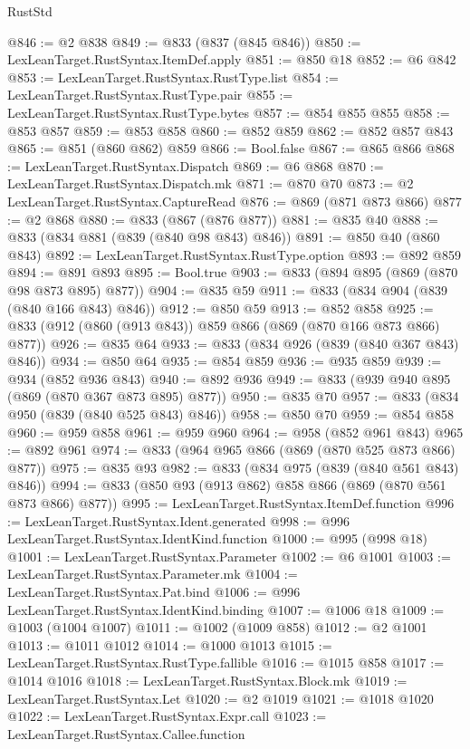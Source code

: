 \begin{lexlean}{RustStd}
\begin{coremodule}
@846 := @2 @838
@849 := @833 (@837 (@845 @846))
@850 := LexLeanTarget.RustSyntax.ItemDef.apply
@851 := @850 @18
@852 := @6 @842
@853 := LexLeanTarget.RustSyntax.RustType.list
@854 := LexLeanTarget.RustSyntax.RustType.pair
@855 := LexLeanTarget.RustSyntax.RustType.bytes
@857 := @854 @855 @855
@858 := @853 @857
@859 := @853 @858
@860 := @852 @859
@862 := @852 @857 @843
@865 := @851 (@860 @862) @859
@866 := Bool.false
@867 := @865 @866
@868 := LexLeanTarget.RustSyntax.Dispatch
@869 := @6 @868
@870 := LexLeanTarget.RustSyntax.Dispatch.mk
@871 := @870 @70
@873 := @2 LexLeanTarget.RustSyntax.CaptureRead
@876 := @869 (@871 @873 @866)
@877 := @2 @868
@880 := @833 (@867 (@876 @877))
@881 := @835 @40
@888 := @833 (@834 @881 (@839 (@840 @98 @843) @846))
@891 := @850 @40 (@860 @843)
@892 := LexLeanTarget.RustSyntax.RustType.option
@893 := @892 @859
@894 := @891 @893
@895 := Bool.true
@903 := @833 (@894 @895 (@869 (@870 @98 @873 @895) @877))
@904 := @835 @59
@911 := @833 (@834 @904 (@839 (@840 @166 @843) @846))
@912 := @850 @59
@913 := @852 @858
@925 := @833 (@912 (@860 (@913 @843)) @859 @866 (@869 (@870 @166 @873 @866) @877))
@926 := @835 @64
@933 := @833 (@834 @926 (@839 (@840 @367 @843) @846))
@934 := @850 @64
@935 := @854 @859
@936 := @935 @859
@939 := @934 (@852 @936 @843)
@940 := @892 @936
@949 := @833 (@939 @940 @895 (@869 (@870 @367 @873 @895) @877))
@950 := @835 @70
@957 := @833 (@834 @950 (@839 (@840 @525 @843) @846))
@958 := @850 @70
@959 := @854 @858
@960 := @959 @858
@961 := @959 @960
@964 := @958 (@852 @961 @843)
@965 := @892 @961
@974 := @833 (@964 @965 @866 (@869 (@870 @525 @873 @866) @877))
@975 := @835 @93
@982 := @833 (@834 @975 (@839 (@840 @561 @843) @846))
@994 := @833 (@850 @93 (@913 @862) @858 @866 (@869 (@870 @561 @873 @866) @877))
@995 := LexLeanTarget.RustSyntax.ItemDef.function
@996 := LexLeanTarget.RustSyntax.Ident.generated
@998 := @996 LexLeanTarget.RustSyntax.IdentKind.function
@1000 := @995 (@998 @18)
@1001 := LexLeanTarget.RustSyntax.Parameter
@1002 := @6 @1001
@1003 := LexLeanTarget.RustSyntax.Parameter.mk
@1004 := LexLeanTarget.RustSyntax.Pat.bind
@1006 := @996 LexLeanTarget.RustSyntax.IdentKind.binding
@1007 := @1006 @18
@1009 := @1003 (@1004 @1007)
@1011 := @1002 (@1009 @858)
@1012 := @2 @1001
@1013 := @1011 @1012
@1014 := @1000 @1013
@1015 := LexLeanTarget.RustSyntax.RustType.fallible
@1016 := @1015 @858
@1017 := @1014 @1016
@1018 := LexLeanTarget.RustSyntax.Block.mk
@1019 := LexLeanTarget.RustSyntax.Let
@1020 := @2 @1019
@1021 := @1018 @1020
@1022 := LexLeanTarget.RustSyntax.Expr.call
@1023 := LexLeanTarget.RustSyntax.Callee.function

\end{coremodule}
\end{lexlean}
